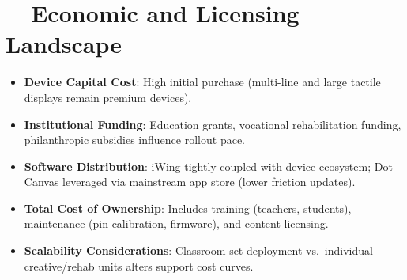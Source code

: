 \section{~~Economic and Licensing Landscape}
\label{sec:sr29-economics}
\begin{itemize}
	\item \textbf{Device Capital Cost}: High initial purchase (multi-line and large tactile displays remain premium devices).
	\item \textbf{Institutional Funding}: Education grants, vocational rehabilitation funding, philanthropic subsidies influence rollout pace\supercite{floridareading_monarch}.
	\item \textbf{Software Distribution}: iWing tightly coupled with device ecosystem; Dot Canvas leveraged via mainstream app store (lower friction updates)\supercite{dot_appstore}.
	\item \textbf{Total Cost of Ownership}: Includes training (teachers, students), maintenance (pin calibration, firmware), and content licensing.
	\item \textbf{Scalability Considerations}: Classroom set deployment vs.\ individual creative/rehab units alters support cost curves.
\end{itemize}

